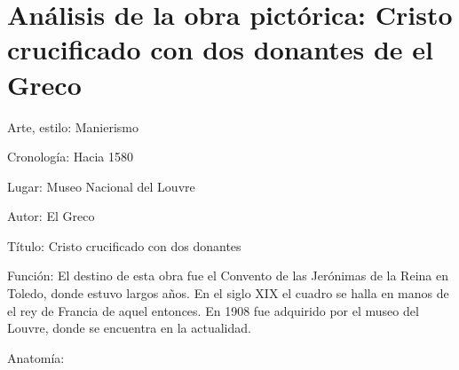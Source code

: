 \section{Análisis de la obra pictórica: Cristo crucificado con dos donantes de el Greco}

Arte, estilo: Manierismo

Cronología: Hacia 1580

Lugar: Museo Nacional del Louvre

Autor: El Greco

Título: Cristo crucificado con dos donantes

Función: El destino de esta obra fue el Convento de las Jerónimas de la Reina en Toledo, donde estuvo largos años. En el siglo XIX el cuadro se halla en manos de el rey de Francia de aquel entonces. En 1908 fue adquirido por el museo del Louvre, donde se encuentra en la actualidad. %

Anatomía: